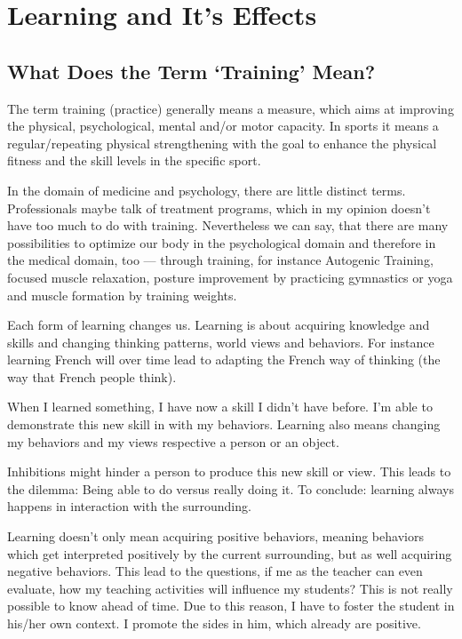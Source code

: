 \documentclass[../main.tex]{subfiles}
\begin{document}
      \chapter{Learning and It's Effects}

      \section{What Does the Term `Training' Mean?}

      The term training (practice) generally means a measure, which aims at improving the physical, psychological, mental and/or motor capacity.
      In sports it means a regular/repeating physical strengthening with the goal to enhance the physical fitness and the skill levels in the specific sport.

      In the domain of medicine and psychology, there are little distinct terms. Professionals maybe talk of treatment programs, which in my opinion doesn't have too much to do with training.
      Nevertheless we can say, that there are many possibilities to optimize our body in the psychological domain and therefore in the medical domain, too --- through training, for instance Autogenic Training, focused muscle relaxation, posture improvement by practicing gymnastics or yoga and muscle formation by training weights.


      Each form of {learning changes} us. Learning is about  acquiring knowledge and skills and  changing thinking patterns, world views and behaviors. For instance learning French will over time lead to adapting the French way of thinking (the way that French people think).
    
      When I learned something, I have now a skill I didn't have before. I'm able to demonstrate this new skill in with my behaviors.
      Learning also means changing my behaviors and my views respective a person or an object.

      {Inhibitions might hinder a person to produce this new skill or view. This leads to the dilemma: Being able to do versus really doing it. To conclude: {learning always happens in interaction with the surrounding.}}

      Learning doesn't only mean acquiring positive behaviors, meaning behaviors which get interpreted positively by the current surrounding, but as well acquiring negative behaviors.
      This lead to the questions, if me as the teacher can even evaluate, how my teaching activities will influence my students? This is not really possible to know ahead of time.
Due to this reason, I have to foster the student in his/her own context. I promote the sides in him, which already are positive.
      
\end{document}
